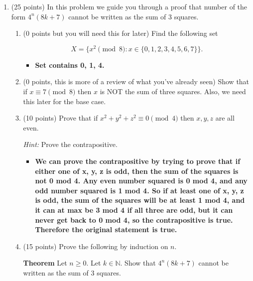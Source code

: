 \documentclass[12pt]{article}
\newcommand{\N}{{\mathbb N}}
\begin{document}
\begin{enumerate}
\vfill

\centerline{\bf GO TO NEXT PAGE}

\newpage





\item
(25 points) In this problem we guide you through a proof that number of the
form $4^n(8k+7)$ cannot be written as the sum of 3 squares. 

\begin{enumerate}
\item
(0 points but you will need this for later)
Find the following set 

$$X = \{ x^2 \pmod 8 \colon x\in \{0,1,2,3,4,5,6,7\}\}.$$
\begin{itemize}
    \item \textbf{Set contains 0, 1, 4.}
\end{itemize}
\item
(0 points, this is more of a review of what you've already seen) 
Show that if $x\equiv 7 \pmod 8$ then $x$ is NOT the sum of three squares. 
Also, we need this later for the base case. 

\item
(10 points) 
Prove that if $x^2+y^2+z^2 \equiv 0 \pmod 4$ then $x,y,z$ are all even. 

{\it Hint:} Prove the contrapositive.
\begin{itemize}
    \item \textbf{We can prove the contrapositive by trying to prove that if either one of x, y, z is odd, then the sum of the squares is not 0 mod 4. Any even number squared is 0 mod 4, and any odd number squared is 1 mod 4. So if at least one of x, y, z is odd, the sum of the squares will be at least 1 mod 4, and it can at max be 3 mod 4 if all three are odd, but it can never get back to 0 mod 4, so the contrapositive is true. Therefore the original statement is true.}
\end{itemize}


\item
(15 points) 
Prove the following by induction on $n$. 

{\bf Theorem} Let $n\ge 0$. Let $k\in\N$. Show that $4^n(8k+7)$ cannot be written
as the sum of 3 squares. 


\end{enumerate}
\end{enumerate}
\end{document}

